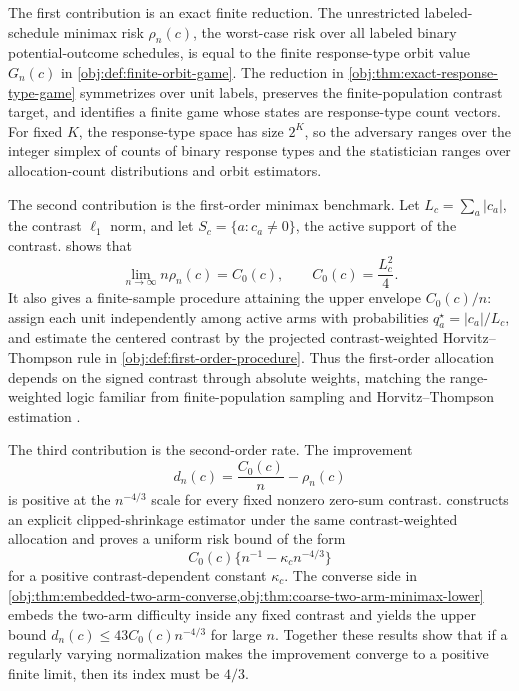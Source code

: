The first contribution is an exact finite reduction. The unrestricted labeled-schedule minimax risk \(\rho_n(c)\), the worst-case risk over all labeled binary potential-outcome schedules, is equal to the finite response-type orbit value \(G_n(c)\) in \cref{obj:def:finite-orbit-game}. The reduction in \cref{obj:thm:exact-response-type-game} symmetrizes over unit labels, preserves the finite-population contrast target, and identifies a finite game whose states are response-type count vectors. For fixed \(K\), the response-type space has size \(2^K\), so the adversary ranges over the integer simplex of counts of binary response types and the statistician ranges over allocation-count distributions and orbit estimators.

The second contribution is the first-order minimax benchmark. Let \(L_c=\sum_a |c_a|\), the contrast \(\ell_1\) norm, and let \(S_c=\{a:c_a\ne0\}\), the active support of the contrast.  shows that
\[
\lim_{n\to\infty} n\rho_n(c)=C_0(c),
\qquad
C_0(c)=\frac{L_c^2}{4}.
\]
It also gives a finite-sample procedure attaining the upper envelope \(C_0(c)/n\): assign each unit independently among active arms with probabilities \(q_a^\star=|c_a|/L_c\), and estimate the centered contrast by the projected contrast-weighted Horvitz--Thompson rule in \cref{obj:def:first-order-procedure}. Thus the first-order allocation depends on the signed contrast through absolute weights, matching the range-weighted logic familiar from finite-population sampling and Horvitz--Thompson estimation \citep{horvitz_1952,hansen_1953,sarndal_1992,aronow_lopatto_2026_minimax_unbiased}.

The third contribution is the second-order rate. The improvement
\[
d_n(c)=\frac{C_0(c)}{n}-\rho_n(c)
\]
is positive at the \(n^{-4/3}\) scale for every fixed nonzero zero-sum contrast.  constructs an explicit clipped-shrinkage estimator under the same contrast-weighted allocation and proves a uniform risk bound of the form
\[
C_0(c)\{n^{-1}-\kappa_c n^{-4/3}\}
\]
for a positive contrast-dependent constant \(\kappa_c\). The converse side in \cref{obj:thm:embedded-two-arm-converse,obj:thm:coarse-two-arm-minimax-lower} embeds the two-arm difficulty inside any fixed contrast and yields the upper bound \(d_n(c)\le 43C_0(c)n^{-4/3}\) for large \(n\). Together these results show that if a regularly varying normalization makes the improvement converge to a positive finite limit, then its index must be \(4/3\).

